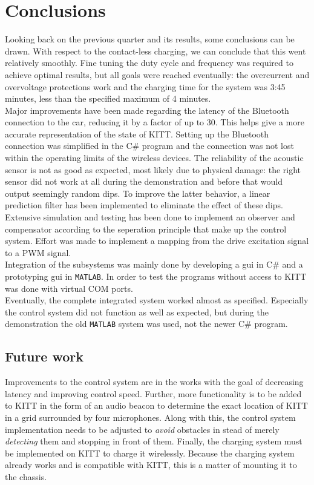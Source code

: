 \documentclass[11pt,titlepage]{report}
\begin{document}
\chapter{Conclusions}
Looking back on the previous quarter and its results, some conclusions can be drawn. With respect to the contact-less charging, we can conclude that this went relatively smoothly. Fine tuning the duty cycle and frequency was required to achieve optimal results, but all goals were reached eventually: the overcurrent and overvoltage protections work and the charging time for the system was 3:45 minutes, less than the specified maximum of 4 minutes. \\
Major improvements have been made regarding the latency of the Bluetooth connection to the car, reducing it by a factor of up to 30. This helps give a more accurate representation of the state of KITT. Setting up the Bluetooth connection was simplified in the C\# program and the connection was not lost within the operating limits of the wireless devices. The reliability of the acoustic sensor is not as good as expected, most likely due to physical damage: the right sensor did not work at all during the demonstration and before that would output seemingly random dips. To improve the latter behavior, a linear prediction filter has been implemented to eliminate the effect of these dips.\\
Extensive simulation and testing has been done to implement an observer and compensator according to the seperation principle that make up the control system. Effort was made to implement a mapping from the drive excitation signal to a PWM signal.\\
Integration of the subsystems was mainly done by developing a gui in C\# and a prototyping gui in \texttt{MATLAB}. In order to test the programs without access to KITT was done with virtual COM ports. \\
Eventually, the complete integrated system worked almost as specified. Especially the control system did not function as well as expected, but during the demonstration the old \texttt{MATLAB} system was used, not the newer C\# program.

\section{Future work}
Improvements to the control system are in the works with the goal of decreasing latency and improving control speed. Further, more functionality is to be added to KITT in the form of an audio beacon to determine the exact location of KITT in a grid surrounded by four microphones. Along with this, the control system implementation needs to be adjusted to \textit{avoid} obstacles in stead of merely \textit{detecting} them and stopping in front of them. Finally, the charging system must be implemented on KITT to charge it wirelessly. Because the charging system already works and is compatible with KITT, this is a matter of mounting it to the chassis.
\end{document}

